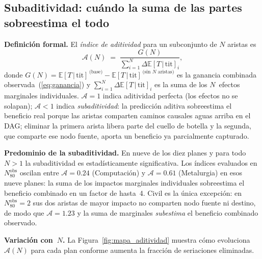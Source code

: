 \documentclass[11pt,letterpaper]{article}
\newcommand{\ETtit}{\mathbb{E}[T\,|\,\mathrm{tit}]}
\begin{document}
\subsection{Subaditividad: cuándo la suma de las partes sobreestima el todo}
\label{sec:subaditividad}

\noindent\textbf{Definición formal.}
El \emph{índice de aditividad} para un subconjunto de $N$ aristas es
\begin{equation}
  \mathcal{A}(N)
  \;=\; \frac{G(N)}{\displaystyle\sum_{i=1}^{N}\Delta\ETtit_i},
  \label{eq:aditividad}
\end{equation}
donde $G(N)=\ETtit^{\,\text{(base)}}-\ETtit^{\,\text{(sin $N$ aristas)}}$
es la ganancia combinada observada~(\ref{eq:ganancia}) y
$\sum_{i=1}^{N}\Delta\ETtit_i$ es la suma de los $N$~efectos marginales
individuales.
$\mathcal{A} = 1$ indica aditividad perfecta (los efectos no se solapan);
$\mathcal{A} < 1$ indica \emph{subaditividad}: la predicción aditiva sobreestima
el beneficio real porque las aristas comparten caminos causales aguas arriba
en el DAG; eliminar la primera arista libera parte del cuello de botella y la
segunda, que comparte ese nodo fuente, aporta un beneficio ya parcialmente
capturado.

\noindent\textbf{Predominio de la subaditividad.}
En nueve de los diez planes y para todo~$N > 1$ la subaditividad es
estadísticamente significativa.
Los índices evaluados en $N_{80}^{\mathrm{obs}}$ oscilan entre
$\mathcal{A} = 0.24$ (Computación) y $\mathcal{A} = 0.61$ (Metalurgia) en esos
nueve planes: la suma de los impactos marginales individuales sobreestima el
beneficio combinado en un factor de hasta~4.
Civil es la única excepción: en $N_{80}^{\mathrm{obs}}=2$ sus dos aristas de
mayor impacto no comparten nodo fuente ni destino, de modo que
$\mathcal{A}=1.23$ y la suma de marginales \emph{subestima} el beneficio
combinado observado.

\noindent\textbf{Variación con~$N$.}
La Figura~\ref{fig:mapa_aditividad} muestra cómo evoluciona $\mathcal{A}(N)$
para cada plan conforme aumenta la fracción de seriaciones eliminadas.
\end{document}
